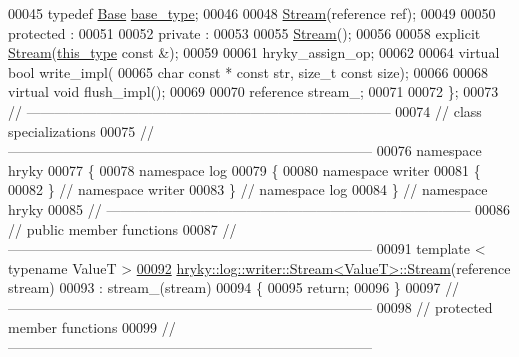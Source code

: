 \begin{DoxyCode}
00045     \textcolor{keyword}{typedef} \hyperlink{classhryky_1_1log_1_1writer_1_1_base}{Base} \hyperlink{classhryky_1_1log_1_1writer_1_1_base}{base_type};
00046 
00048     \hyperlink{classhryky_1_1log_1_1writer_1_1_stream}{Stream}(reference ref);
00049 
00050 \textcolor{keyword}{protected} :
00051 
00052 \textcolor{keyword}{private} :
00053 
00055     \hyperlink{classhryky_1_1log_1_1writer_1_1_stream}{Stream}();
00056 
00058     \textcolor{keyword}{explicit} \hyperlink{classhryky_1_1log_1_1writer_1_1_stream}{Stream}(\hyperlink{classhryky_1_1log_1_1writer_1_1_base}{this_type} \textcolor{keyword}{const} &);
00059 
00061     hryky\_assign\_op;
00062 
00064     \textcolor{keyword}{virtual} \textcolor{keywordtype}{bool} write\_impl(
00065         \textcolor{keywordtype}{char} \textcolor{keyword}{const} * \textcolor{keyword}{const} str, \textcolor{keywordtype}{size\_t} \textcolor{keyword}{const} size);
00066 
00068     \textcolor{keyword}{virtual} \textcolor{keywordtype}{void} flush\_impl();
00069 
00070     reference stream\_;
00071 
00072 \};
00073 \textcolor{comment}{//
      ------------------------------------------------------------------------------}
00074 \textcolor{comment}{// class specializations}
00075 \textcolor{comment}{//
      ------------------------------------------------------------------------------}
00076 \textcolor{keyword}{namespace }hryky
00077 \{
00078 \textcolor{keyword}{namespace }log
00079 \{
00080 \textcolor{keyword}{namespace }writer
00081 \{
00082 \} \textcolor{comment}{// namespace writer}
00083 \} \textcolor{comment}{// namespace log}
00084 \} \textcolor{comment}{// namespace hryky}
00085 \textcolor{comment}{//
      ------------------------------------------------------------------------------}
00086 \textcolor{comment}{// public member functions}
00087 \textcolor{comment}{//
      ------------------------------------------------------------------------------}
00091 \textcolor{comment}{}\textcolor{keyword}{template} < \textcolor{keyword}{typename} ValueT >
\hypertarget{log__writer__stream_8h_source_l00092}{}\hyperlink{classhryky_1_1log_1_1writer_1_1_stream_a7b27b6dde500b43a948077d1fabe0084}{00092} \hyperlink{classhryky_1_1log_1_1writer_1_1_stream}{hryky::log::writer::Stream<ValueT>::Stream}(reference stream)
00093     : stream\_(stream)
00094 \{
00095     \textcolor{keywordflow}{return};
00096 \}
00097 \textcolor{comment}{//
      ------------------------------------------------------------------------------}
00098 \textcolor{comment}{// protected member functions}
00099 \textcolor{comment}{//
      ------------------------------------------------------------------------------}

\end{DoxyCode}
